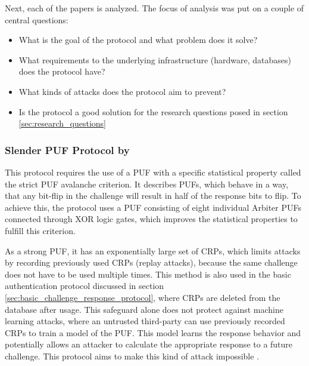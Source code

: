 Next, each of the papers is analyzed.
The focus of analysis was put on a couple of central questions:
\begin{itemize}
    \item What is the goal of the protocol and what problem does it solve?
    \item What requirements to the underlying infrastructure (hardware, databases) does the protocol have?
    \item What kinds of attacks does the protocol aim to prevent?
    \item Is the protocol a good solution for the research questions posed in section \ref{sec:research_questions}
\end{itemize}

\subsubsection{Slender PUF Protocol by \citeauthor*{Majzoobi2012}}
\label{sec:review_protocol_1}

This protocol requires the use of a PUF with a specific statistical property called the
strict PUF avalanche criterion.
It describes PUFs, which behave in a way, that any bit-flip in the challenge will result in half of
the response bits to flip. To achieve this, the protocol uses a PUF consisting of eight individual
Arbiter PUFs connected through XOR logic gates, which improves the statistical properties to fulfill
this criterion. \cite{Majzoobi2012}

As a strong PUF, it has an exponentially large set of CRPs, which limits attacks by recording previously
used \acp{CRP} (replay attacks), because the same challenge does not have to be used multiple times.
This method is also used in the basic authentication protocol discussed in section \ref{sec:basic_challenge_response_protocol}, where
CRPs are deleted from the database after usage.
This safeguard alone does not protect against machine learning attacks, where an untrusted third-party
can use previously recorded CRPs to train a model of the PUF. This model learns the response behavior
and potentially allows an attacker to calculate the appropriate response to a future challenge.
This protocol aims to make this kind of attack impossible \cite[][p. 34f]{Majzoobi2012}.

